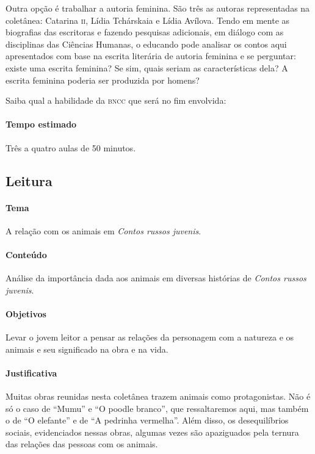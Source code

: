 \documentclass[11pt]{extarticle}
\begin{document}

Outra opção é trabalhar a autoria feminina. São três as autoras
representadas na coletânea: Catarina \textsc{ii}, Lídia Tchárskaia e Lídia
Avílova. Tendo em mente as biografias das escritoras e fazendo pesquisas
adicionais, em diálogo com as disciplinas das Ciências Humanas, o educando pode analisar os contos aqui apresentados com
base na escrita literária de autoria feminina e se perguntar: existe uma
escrita feminina? Se sim, quais seriam as características dela? A
escrita feminina poderia ser produzida por homens?

Saiba qual a habilidade da \textsc{bncc} que será no fim envolvida:

\paragraph{Tempo estimado} Três a quatro aulas de 50 minutos.

\subsection{Leitura}

\paragraph{Tema} A relação com os animais em \emph{Contos russos juvenis}.

\paragraph{Conteúdo}
Análise da importância dada aos animais em diversas histórias de
\emph{Contos russos juvenis}.

\paragraph{Objetivos}
Levar o jovem leitor a pensar as relações da personagem com a natureza e
os animais e seu significado na obra e na vida.

\paragraph{Justificativa}
Muitas obras reunidas nesta coletânea trazem animais como protagonistas.
Não é só o caso de ``Mumu'' e ``O poodle branco'', que ressaltaremos aqui,
mas também o de ``O elefante'' e de ``A pedrinha vermelha''. Além
disso, os desequilíbrios sociais, evidenciados nessas obras, algumas
vezes são apaziguados pela ternura das relações das pessoas com os
animais.
\end{document}
